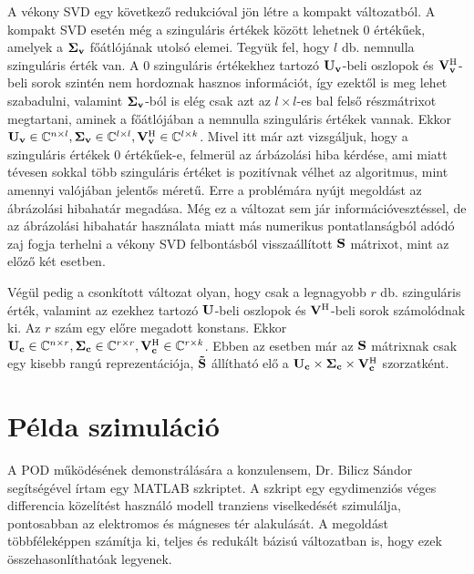             \par
            A vékony SVD egy következő redukcióval jön létre a kompakt változatból. A kompakt SVD esetén még a szinguláris értékek között lehetnek 0 értékűek, amelyek a ${\bf \Sigma_v}$ főátlójának utolsó elemei. Tegyük fel, hogy $l$ db. nemnulla szinguláris érték van. A 0 szinguláris értékekhez tartozó ${\bf U_v}$-beli oszlopok és ${\bf V_v^{\mathrm{H}}}$-beli sorok szintén nem hordoznak hasznos információt, így ezektől is meg lehet szabadulni, valamint ${\bf \Sigma_v}$-ból is elég csak azt az $l\times l$-es bal felső részmátrixot megtartani, aminek a főátlójában a nemnulla szinguláris értékek vannak. Ekkor ${\bf U_v} \in \mathbb{C}^{n\times l}, {\bf \Sigma_v} \in \mathbb{C}^{l\times l}, {\bf V_v^{\mathrm{H}}} \in \mathbb{C}^{l\times k}$. Mivel itt már azt vizsgáljuk, hogy a szinguláris értékek 0 értékűek-e, felmerül az árbázolási hiba kérdése, ami miatt tévesen sokkal több szinguláris értéket is pozitívnak vélhet az algoritmus, mint amennyi valójában jelentős méretű. Erre a problémára nyújt megoldást az ábrázolási hibahatár megadása. Még ez a változat sem jár információvesztéssel, de az ábrázolási hibahatár használata miatt más numerikus pontatlanságból adódó zaj fogja terhelni a vékony SVD felbontásból visszaállított ${\bf S}$ mátrixot, mint az előző két esetben.
            \par
            Végül pedig a csonkított változat olyan, hogy csak a legnagyobb $r$ db. szinguláris érték, valamint az ezekhez tartozó ${\bf U}$-beli oszlopok és ${\bf V^{\mathrm{H}}}$-beli sorok számolódnak ki. Az $r$ szám egy előre megadott konstans. Ekkor ${\bf U_c} \in \mathbb{C}^{n\times r}, {\bf \Sigma_c} \in \mathbb{C}^{r\times r}, {\bf V_c^{\mathrm{H}}} \in \mathbb{C}^{r\times k}$. Ebben az esetben már az ${\bf S}$ mátrixnak csak egy kisebb rangú reprezentációja, ${\bf \tilde{S}}$ állítható elő a ${\bf U_c \times\Sigma_c\times V_c^{\mathrm{H}}}$ szorzatként.
    \section{Példa szimuláció}
        A POD működésének demonstrálására a konzulensem, Dr. Bilicz Sándor segítségével írtam egy MATLAB szkriptet. A szkript egy egydimenziós véges differencia közelítést használó modell tranziens viselkedését szimulálja, pontosabban az elektromos és mágneses tér alakulását. A megoldást többféleképpen számítja ki, teljes és redukált bázisú változatban is, hogy ezek összehasonlíthatóak legyenek.
